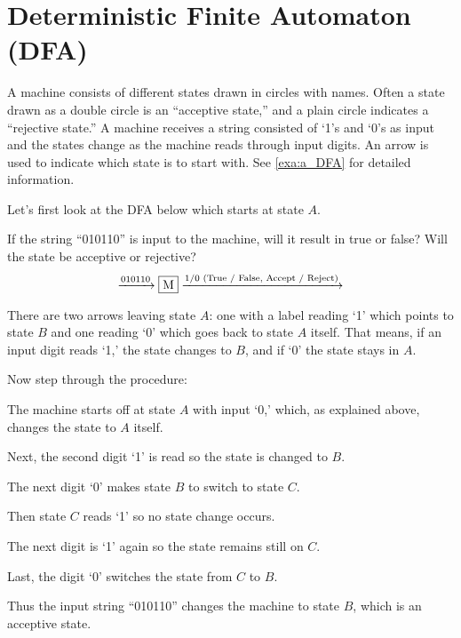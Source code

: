 
\section{Deterministic Finite Automaton (DFA)}

A machine consists of different states drawn in circles with names. Often a state drawn as
a double circle is an ``acceptive state,'' and a plain circle indicates a ``rejective
state.'' A machine receives a string consisted of `1's and `0's as input and the states
change as the machine reads through input digits. An arrow is used to indicate which state
is to start with. See \autoref{exa:a_DFA} for detailed information.

\begin{example}[A DFA]
    \label{exa:a_DFA}

    Let's first look at the DFA below which starts at state $A$.

    If the string ``010110'' is input to the machine, will it result in true or false?
    Will the state be acceptive or rejective?
    \[
        \xrightarrow{010110}
        \fbox{M}
        \xrightarrow{1/0 \text{ (True / False, Accept / Reject)}}
    \]

    There are two arrows leaving state $A$: one with a label reading `1' which points to
    state $B$ and one reading `0' which goes back to state $A$ itself. That means, if an
    input digit reads `1,' the state changes to $B$, and if `0' the state stays in $A$.

    Now step through the procedure:
    \begin{compactenum}
    \item
        The machine starts off at state $A$ with input `0,' which, as explained above,
        changes the state to $A$ itself.
    \item
        Next, the second digit `1' is read so the state is changed to $B$.
    \item
        The next digit `0' makes state $B$ to switch to state $C$.
    \item
        Then state $C$ reads `1' so no state change occurs.
    \item
        The next digit is `1' again so the state remains still on $C$.
    \item
        Last, the digit `0' switches the state from $C$ to $B$.
    \end{compactenum}
    Thus the input string ``010110'' changes the machine to state $B$, which is an
    acceptive state.

\end{example}


